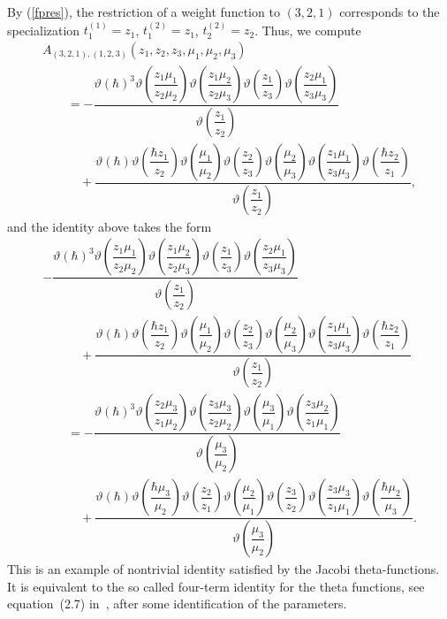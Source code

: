 \documentclass[pdftex]{sigma}
\let\thi\vartheta
\numberwithin{equation}{section}
\begin{document}
By (\ref{fpres}), the restriction of a weight function to $(3,2,1)$ corresponds to the specialization $t^{(1)}_1 =z_{{1}}$, $t^{(2)}_1 =z_{{1}}$, $t^{(2)}_2=z_{{2}}$. Thus, we compute
\begin{gather*}
A_{(3, 2, 1), (1, 2, 3)}(z_1,z_2,z_3,\mu_1,\mu_2,\mu_3) \\
\qquad{}= -\dfrac{\thi ( \hbar ) ^{3}\thi \left( {\dfrac {z
 _{{1}}\mu_{{1}}}{z_{{2}}\mu_{{2}}}} \right) \thi \left( {\dfrac {z_{{
 1}}\mu_{{2}}}{z_{{2}}\mu_{{3}}}} \right) \thi \left( {\dfrac {z_{{1}}
 }{z_{{3}}}} \right) \thi \left( {\dfrac {z_{{2}}\mu_{{1}}}{z_{{3}}\mu
 _{{3}}}} \right)}{\thi \left( {\dfrac {z_{{1}}}{z_{{2}}}} \right)} \\
 \qquad\quad{} +
 \dfrac{\thi( \hbar ) \thi \left( {
 \dfrac {\hbar z_{{1}}}{z_{{2}}}} \right) \thi \left( {\dfrac {\mu_{{1}}}{
 \mu_{{2}}}} \right) \thi \left( {\dfrac {z_{{2}}}{z_{{3}}}} \right)
 \thi \left( {\dfrac {\mu_{{2}}}{\mu_{{3}}}} \right) \thi \left( {
 \dfrac {z_{{1}}\mu_{{1}}}{z_{{3}}\mu_{{3}}}} \right) \thi \left( {
 \dfrac {\hbar z_{{2}}}{z_{{1}}}} \right)}{\thi \left( {\dfrac {z_{{1
 }}}{z_{{2}}}} \right)},
\end{gather*}
and the identity above takes the form
\begin{gather*}
-\dfrac{\thi ( \hbar ) ^{3} \thi \left( {\dfrac {z
 _{{1}}\mu_{{1}}}{z_{{2}}\mu_{{2}}}} \right) \thi \left( {\dfrac {z_{{
 1}}\mu_{{2}}}{z_{{2}}\mu_{{3}}}} \right) \thi \left( {\dfrac {z_{{1}}
 }{z_{{3}}}} \right) \thi \left( {\dfrac {z_{{2}}\mu_{{1}}}{z_{{3}}\mu
 _{{3}}}} \right) }{\thi \left( {\dfrac {z_{{1}}}{z_{{2}}}} \right)} \\
 \qquad\quad{} +
\dfrac{\thi( \hbar ) \thi \left( {
 \dfrac {\hbar z_{{1}}}{z_{{2}}}} \right) \thi \left( {\dfrac {\mu_{{1}}}{
 \mu_{{2}}}} \right) \thi \left( {\dfrac {z_{{2}}}{z_{{3}}}} \right)
 \thi \left( {\dfrac {\mu_{{2}}}{\mu_{{3}}}} \right) \thi \left( {
 \dfrac {z_{{1}}\mu_{{1}}}{z_{{3}}\mu_{{3}}}} \right) \thi \left( {
 \dfrac {\hbar z_{{2}}}{z_{{1}}}} \right) }{\thi \left( {\dfrac {z_{{1
 }}}{z_{{2}}}} \right)} \\
\qquad{}=
 - \dfrac{\thi(\hbar)^{3} \thi \left( {\dfrac {z
 _{{2}}\mu_{{3}}}{z_{{1}}\mu_{{2}}}} \right) \thi \left( {\dfrac {z_{{
 3}}\mu_{{3}}}{z_{{2}}\mu_{{2}}}} \right) \thi \left( {\dfrac {\mu_{{3
 }}}{\mu_{{1}}}} \right) \thi \left( {\dfrac {z_{{3}}\mu_{{2}}}{z_{{1}
 }\mu_{{1}}}} \right) }{ \thi \left( {\dfrac {\mu_{{3}}}{\mu_{{2}
 }}} \right) }\\
 \qquad\quad{} +\dfrac{\thi(\hbar) \thi \left( {
 \dfrac {\hbar\mu_{{3}}}{\mu_{{2}}}} \right) \thi \left( {\dfrac {z_{{2}}}{
 z_{{1}}}} \right) \thi \left( {\dfrac {\mu_{{2}}}{\mu_{{1}}}}
 \right) \thi \left( {\dfrac {z_{{3}}}{z_{{2}}}} \right) \thi
 \left( {\dfrac {z_{{3}}\mu_{{3}}}{z_{{1}}\mu_{{1}}}} \right) \thi
 \left( {\dfrac {\hbar \mu_{{2}}}{\mu_{{3}}}} \right) }{ \thi \left(
 {\dfrac {\mu_{{3}}}{\mu_{{2}}}} \right) } .
\end{gather*}
This is an example of nontrivial identity satisfied by the Jacobi theta-functions. It is equivalent to the so called four-term identity for the theta functions, see equation~(2.7) in~\cite{RTV}, after some identification of the parameters.
\end{document}
